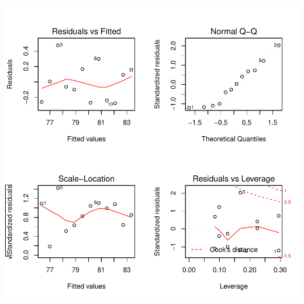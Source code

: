 \documentclass[onecolumn,12pt]{book}
\begin{document}
\includegraphics{RbookParte2-138}
\end{document}
